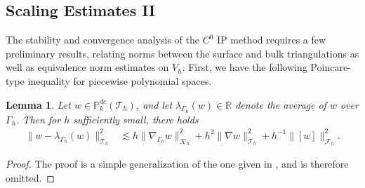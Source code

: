 \documentclass[10pt, a4paper]{amsart}
\newcommand{\bbR}{\mathbb{R}}
\newcommand{\nab}{\nabla}
\newcommand{\calT}{\mathcal{T}}
\newcommand{\calF}{\mathcal{F}}
\newcommand{\calK}{\mathcal{K}}
\newtheorem{lemma}[theorem]{Lemma}
\theoremstyle{definition}
\theoremstyle{remark}
\theoremstyle{example}
\numberwithin{equation}{section}
\begin{document}
\subsection{Scaling Estimates II}
The stability and convergence analysis of the $C^0$ IP method requires a few preliminary results, relating norms between the surface and bulk triangulations as well as equivalence norm estimates on $V_h$. First, we have the following Poincare-type inequality for piecewise polynomial spaces.

\begin{lemma}
Let $w \in \mathbb{P}_k^{dc}(\calT_h)$,
and let $\lambda_{\Gamma_h}(w)\in \bbR$ denote
the average of $w$ over $\Gamma_h$.
Then for $h$ sufficiently small, there holds 
%
\begin{align}
\|w - \lambda_{\Gamma_h}(w)\|_{\calT_h}^2
& \lesssim h\|\nab_{\Gamma_h}w\|_{\calK_h}^2 + h^{2}\|\nab w\|_{\calT_h}^2 + h^{-1}\|[w]\|_{\calF_h}^2.
\label{7.1}
\end{align}
\end{lemma}

\begin{proof}
The proof is a simple generalization of the one given in \cite[Lemma 5.2]{burman2017cut}, and is therefore omitted.
\end{proof}

\end{document}
